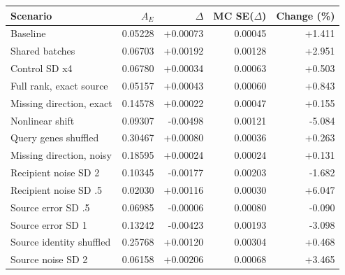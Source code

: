 \begin{tabular}{lrrrr}
\toprule
Scenario & $A_E$ & $\Delta$ & MC SE($\Delta$) & Change (\%) \\
\midrule
Baseline & 0.05228 & +0.00073 & 0.00045 & +1.411 \\
Shared batches & 0.06703 & +0.00192 & 0.00128 & +2.951 \\
Control SD x4 & 0.06780 & +0.00034 & 0.00063 & +0.503 \\
Full rank, exact source & 0.05157 & +0.00043 & 0.00060 & +0.843 \\
Missing direction, exact & 0.14578 & +0.00022 & 0.00047 & +0.155 \\
Nonlinear shift & 0.09307 & -0.00498 & 0.00121 & -5.084 \\
Query genes shuffled & 0.30467 & +0.00080 & 0.00036 & +0.263 \\
Missing direction, noisy & 0.18595 & +0.00024 & 0.00024 & +0.131 \\
Recipient noise SD 2 & 0.10345 & -0.00177 & 0.00203 & -1.682 \\
Recipient noise SD .5 & 0.02030 & +0.00116 & 0.00030 & +6.047 \\
Source error SD .5 & 0.06985 & -0.00006 & 0.00080 & -0.090 \\
Source error SD 1 & 0.13242 & -0.00423 & 0.00193 & -3.098 \\
Source identity shuffled & 0.25768 & +0.00120 & 0.00304 & +0.468 \\
Source noise SD 2 & 0.06158 & +0.00206 & 0.00068 & +3.465 \\
\bottomrule
\end{tabular}
